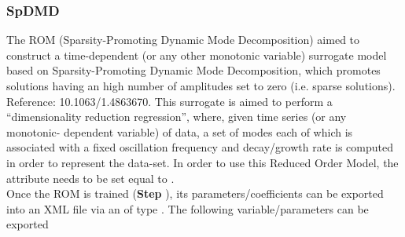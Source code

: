 \subsubsection{SpDMD}
  The  ROM (Sparsity-Promoting Dynamic Mode Decomposition) aimed to construct a
  time-dependent (or any other monotonic     variable) surrogate model based on Sparsity-Promoting
  Dynamic Mode Decomposition, which promotes solutions having an high number of     amplitudes set
  to zero (i.e. sparse solutions). Reference: 10.1063/1.4863670.     This surrogate is aimed to
  perform a ``dimensionality reduction regression'', where, given time     series (or any monotonic-
  dependent variable) of data, a set of modes each of which is associated     with a fixed
  oscillation frequency and decay/growth rate is computed     in order to represent the data-set.
  In order to use this Reduced Order Model, the  attribute      needs
  to be set equal to .     \\     Once the ROM  is trained (\textbf{Step}
  ), its parameters/coefficients can be exported into an XML file     via an
   of type . The following variable/parameters  can be exported
